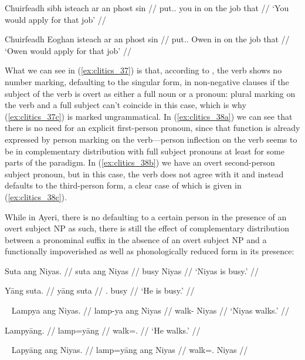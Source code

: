 \a\label{ex:clitics_38b}\begingl
	\gla Chuirfeadh sibh isteach ar an phost sin //
	\glb put.\Cond{}.\Tsg{} you in on the job that //
	\glft `You would apply for that job' //
\endgl

\a\label{ex:clitics_38c}\begingl
	\gla Chuirfeadh Eoghan isteach ar an phost sin //
	\glb put.\Cond{}.\Tsg{} Owen in on the job that //
	\glft `Owen would apply for that job' //
\endgl
\xe

What we can see in (\ref{ex:clitics_37}) is that, according to
\citet{spencerluis2012}, the verb shows no number marking, defaulting to the
singular form, in non-negative clauses if the subject of the verb is overt as
either a full noun or a pronoun: plural marking on the verb and a full subject
can't coincide in this case, which is why (\ref{ex:clitics_37c}) is marked
ungrammatical. In (\ref{ex:clitics_38a}) we can see that there is no need for
an explicit first-person pronoun, since that function is already expressed by
person marking on the verb—person inflection on the verb seems to be in
complementary distribution with full subject pronouns at least for some parts
of the paradigm. In (\ref{ex:clitics_38b}) we have an overt second-person
subject pronoun, but in this case, the verb does not agree with it and instead
defaults to the third-person form, a clear case of which is given in
(\ref{ex:clitics_38c}).

While in Ayeri, there is no defaulting to a certain person in the presence of
an overt subject NP as such, there is still the effect of complementary
distribution between a pronominal suffix in the absence of an overt subject NP
and a functionally impoverished as well as phonologically reduced form in its
presence:

\pex\label{ex:clitics_39}
\a\label{ex:clitics_39a}\begingl
	\gla Suta ang Niyas. //
	\glb suta ang Niyas //
	\glc busy \Aarg{} Niyas //
	\glft `Niyas is busy.' //
\endgl

\a\label{ex:clitics_39b}\begingl
	\gla Yāng suta. //
	\glb yāng suta //
	\glc \TsgM{}.\Aarg{} busy //
	\glft `He is busy.' //
\endgl
\xe

\pex~\label{ex:clitics_40}
\a\label{ex:clitics_40a}\begingl
	\gla Lampya ang Niyas. //
	\glb lamp-ya ang Niyas //
	\glc walk-\TsgM{} \Aarg{} Niyas //
	\glft `Niyas walks.' //
\endgl

\a\label{ex:clitics_40b}\begingl
	\gla Lampyāng. //
	\glb lamp=yāng //
	\glc walk=\TsgM{}.\Aarg{} //
	\glft `He walks.' //
\endgl
\xe

\pex~\label{ex:clitics_41}
\a\label{ex:clitics_41a}\ljudge{*}\begingl
	\gla Lapyāng ang Niyas. //
	\glb lamp=yāng ang Niyas //
	\glc walk=\TsgM{}.\Aarg{} \Aarg{} Niyas //
\endgl

